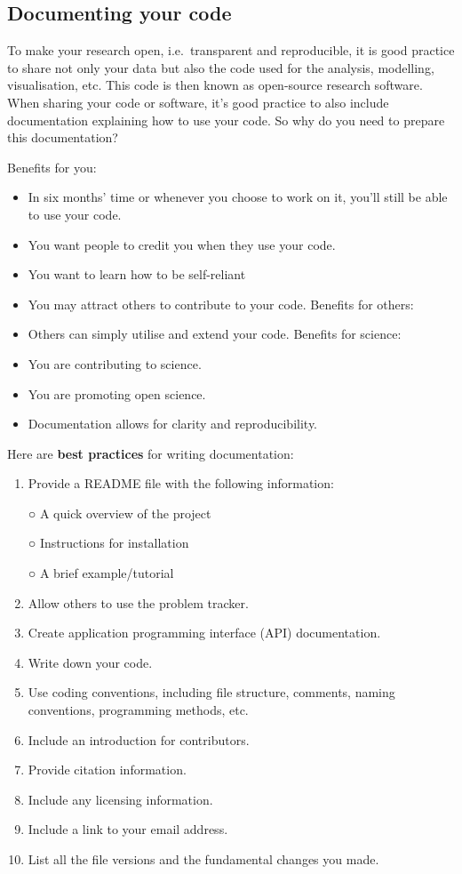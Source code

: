 \documentclass[
]{book}
\providecommand{\tightlist}{%
  \setlength{\itemsep}{0pt}\setlength{\parskip}{0pt}}
\begin{document}
\hypertarget{documenting-your-code}{%
\subsection*{Documenting your code}\label{documenting-your-code}}

To make your research open, i.e.~transparent and reproducible, it is good practice to share not only your data but also the code used for the analysis, modelling, visualisation, etc. This code is then known as open-source research software. When sharing your code or software, it's good practice to also include documentation explaining how to use your code. So why do you need to prepare this documentation?

Benefits for you:

\begin{itemize}
\tightlist
\item
  In six months' time or whenever you choose to work on it, you'll still be able to use your code.
\item
  You want people to credit you when they use your code.
\item
  You want to learn how to be self-reliant
\item
  You may attract others to contribute to your code. Benefits for others:
\item
  Others can simply utilise and extend your code. Benefits for science:
\item
  You are contributing to science.
\item
  You are promoting open science.
\item
  Documentation allows for clarity and reproducibility.
\end{itemize}

Here are \textbf{best practices} for writing documentation:

\begin{enumerate}
\def\labelenumi{\arabic{enumi}.}
\item
  Provide a README file with the following information:

  ○ A quick overview of the project

  ○ Instructions for installation

  ○ A brief example/tutorial
\item
  Allow others to use the problem tracker.
\item
  Create application programming interface (API) documentation.
\item
  Write down your code.
\item
  Use coding conventions, including file structure, comments, naming conventions, programming methods, etc.
\item
  Include an introduction for contributors.
\item
  Provide citation information.
\item
  Include any licensing information.
\item
  Include a link to your email address.
\item
  List all the file versions and the fundamental changes you made.
\end{enumerate}
\end{document}
